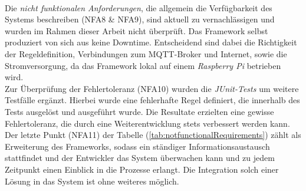         \\
        \linebreak
        Die \textit{nicht funktionalen Anforderungen}, die allgemein die Verfügbarkeit des Systems beschreiben (NFA8 \& NFA9), sind aktuell zu vernachlässigen und wurden im Rahmen dieser 
        Arbeit nicht überprüft. Das Framework selbst produziert von sich aus keine Downtime. Entscheidend sind dabei die Richtigkeit der Regeldefinition, 
        Verbindungen zum \acs{MQTT}-Broker und Internet, sowie die Stromversorgung, da das Framework lokal auf einem \textit{Raspberry Pi} betrieben wird. 
        \\
        \linebreak
        Zur Überprüfung der Fehlertoleranz (NFA10) wurden die \textit{JUnit-Tests} um weitere Testfälle ergänzt. Hierbei wurde eine fehlerhafte Regel definiert, die innerhalb des 
        Tests ausgelöst und ausgeführt wurde. Die Resultate erzielten eine gewisse Fehlertoleranz, die durch eine Weiterentwicklung stets verbessert werden kann.
        \\
        \linebreak
        Der letzte Punkt (NFA11) der Tabelle (\ref{tab:notfunctionalRequirements}) zählt als Erweiterung des Frameworks, sodass ein ständiger Informationsaustausch stattfindet und der 
        Entwickler das System überwachen kann und zu jedem Zeitpunkt einen Einblick in die Prozesse erlangt. Die Integration solch einer Lösung in das System ist ohne weiteres möglich.
    
